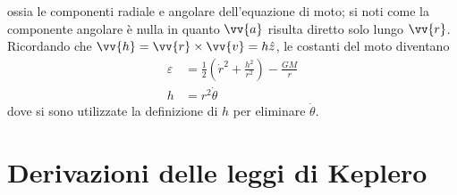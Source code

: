 \documentclass[a4paper, oneside]{book}
\begin{document}
ossia le componenti radiale e angolare dell'equazione di moto; si noti come 
la componente angolare è nulla in quanto $\vv{a}$ risulta diretto solo lungo $\vv{r}$. 
Ricordando che $\vv{h} = \vv{r } \times \vv{v} = h\hat{z}$, le costanti 
del moto diventano 
\begin{align*}
    \varepsilon &= \frac{1}{2}\left(\dot{r}^{2} + \frac{h^{2}}{r^{2}} \right) - \frac{GM}{r} \\
    h &= r^{2} \dot{\theta} 
\end{align*}    
dove si sono utilizzate la definizione di $h$ per eliminare $\dot{\theta}$. 

\clearpage
\section{Derivazioni delle leggi di Keplero}
\end{document}
